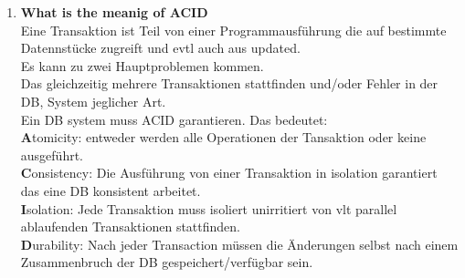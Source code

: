 \documentclass[12pt]{article}\pagestyle{myheadings}
\theoremstyle{plain}
\begin{document}
\begin{enumerate}
\begin{itemize}
\end{itemize}

\item \textbf{What is the meanig of ACID} \\
Eine Transaktion ist Teil von einer Programmausführung die auf bestimmte Datennstücke zugreift und evtl auch aus updated.\\
Es kann zu zwei Hauptproblemen kommen.\\
Das gleichzeitig mehrere Transaktionen stattfinden und/oder Fehler in der DB, System jeglicher Art.\\
Ein DB system muss ACID garantieren. Das bedeutet:\\
\textbf{A}tomicity: entweder werden alle Operationen der Tansaktion oder keine ausgeführt.\\
\textbf{C}onsistency: Die Ausführung von einer Transaktion in isolation garantiert das eine DB konsistent arbeitet.\\
\textbf{I}solation: Jede Transaktion muss isoliert unirritiert von vlt parallel ablaufenden Transaktionen stattfinden.\\
\textbf{D}urability: Nach jeder Transaction müssen die Änderungen selbst nach einem Zusammenbruch der DB  gespeichert/verfügbar sein.\\


\end{enumerate}
\end{document}
